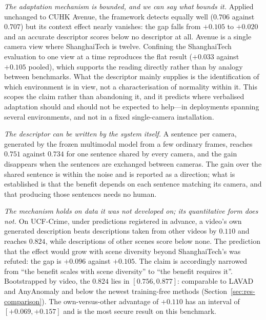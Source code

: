 \documentclass[a4paper,fleqn]{cas-sc}
\begin{document}
\emph{The adaptation mechanism is bounded, and we can say what bounds it.}
Applied unchanged to CUHK Avenue, the framework detects equally well ($0.706$
against $0.707$) but its context effect nearly vanishes: the gap falls from
$+0.105$ to $+0.020$ and an accurate descriptor scores below no descriptor at
all. Avenue is a single camera view where ShanghaiTech is twelve. Confining
the ShanghaiTech evaluation to one view at a time reproduces the flat result
($+0.033$ against $+0.105$ pooled), which supports the reading directly rather
than by analogy between benchmarks. What the descriptor mainly supplies is the
identification of which environment is in view, not a characterisation of
normality within it. This scopes the claim rather than abandoning it, and it
predicts where verbalised adaptation should and should not be expected to
help---in deployments spanning several environments, and not in a fixed
single-camera installation.

\emph{The descriptor can be written by the system itself.} A sentence per camera,
generated by the frozen multimodal model from a few ordinary frames, reaches
$0.751$ against $0.734$ for one sentence shared by every camera, and the gain
disappears when the sentences are exchanged between cameras. The gain over the
shared sentence is within the noise and is reported as a direction; what is
established is that the benefit depends on each sentence matching its camera,
and that producing those sentences needs no human.

\emph{The mechanism holds on data it was not developed on; its quantitative
form does not.} On UCF-Crime, under predictions registered in advance, a
video's own generated description beats descriptions taken from other videos by
$0.110$ and reaches $0.824$, while descriptions of other scenes score below none.
The prediction that the effect would grow with scene diversity beyond
ShanghaiTech's was refuted: the gap is $+0.096$ against $+0.105$. The claim is
accordingly narrowed from ``the benefit scales with scene diversity'' to ``the
benefit requires it''. Bootstrapped by video, the $0.824$ lies in
$[0.756, 0.877]$: comparable to LAVAD and AnyAnomaly and below the newest
training-free methods (Section~\ref{sec:res-comparison}). The
own-versus-other advantage of $+0.110$ has an interval of
$[+0.069, +0.157]$ and is the most secure result on this benchmark.
\end{document}
